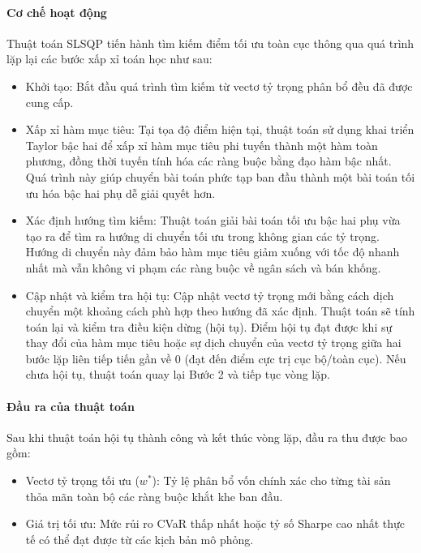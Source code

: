 \paragraph{Cơ chế hoạt động}
Thuật toán SLSQP tiến hành tìm kiếm điểm tối ưu toàn cục thông qua quá trình lặp lại các bước xấp xỉ toán học như sau:
\begin{itemize}
    \item Khởi tạo: Bắt đầu quá trình tìm kiếm từ vectơ tỷ trọng phân bổ đều đã được cung cấp.
    \item Xấp xỉ hàm mục tiêu: Tại tọa độ điểm hiện tại, thuật toán sử dụng khai triển Taylor bậc hai để xấp xỉ hàm mục tiêu phi tuyến thành một hàm toàn phương, đồng thời tuyến tính hóa các ràng buộc bằng đạo hàm bậc nhất. Quá trình này giúp chuyển bài toán phức tạp ban đầu thành một bài toán tối ưu hóa bậc hai phụ dễ giải quyết hơn.
    \item Xác định hướng tìm kiếm: Thuật toán giải bài toán tối ưu bậc hai phụ vừa tạo ra để tìm ra hướng di chuyển tối ưu trong không gian các tỷ trọng. Hướng di chuyển này đảm bảo hàm mục tiêu giảm xuống với tốc độ nhanh nhất mà vẫn không vi phạm các ràng buộc về ngân sách và bán khống.
    \item Cập nhật và kiểm tra hội tụ: Cập nhật vectơ tỷ trọng mới bằng cách dịch chuyển một khoảng cách phù hợp theo hướng đã xác định. Thuật toán sẽ tính toán lại và kiểm tra điều kiện dừng (hội tụ). Điểm hội tụ đạt được khi sự thay đổi của hàm mục tiêu hoặc sự dịch chuyển của vectơ tỷ trọng giữa hai bước lặp liên tiếp tiến gần về 0 (đạt đến điểm cực trị cục bộ/toàn cục). Nếu chưa hội tụ, thuật toán quay lại Bước 2 và tiếp tục vòng lặp.
\end{itemize}
\cite{artzner1999coherent}
\paragraph{Đầu ra của thuật toán} 
Sau khi thuật toán hội tụ thành công và kết thúc vòng lặp, đầu ra thu được bao gồm:
\begin{itemize}
    \item Vectơ tỷ trọng tối ưu ($w^*$): Tỷ lệ phân bổ vốn chính xác cho từng tài sản thỏa mãn toàn bộ các ràng buộc khắt khe ban đầu.
    \item Giá trị tối ưu: Mức rủi ro CVaR thấp nhất hoặc tỷ số Sharpe cao nhất thực tế có thể đạt được từ các kịch bản mô phỏng.

\end{itemize}